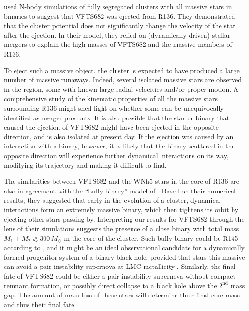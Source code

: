 \documentclass[apjl,twocolumn]{emulateapj}
\DeclareRobustCommand{\Figref}[1]{Fig.~\ref{#1}}
\begin{document}
\citet{banerjee:12} used N-body simulations of fully segregated
clusters with all massive stars in binaries to suggest that VFTS682
was ejected from R136. They
demonstrated that the cluster potential does not significantly change
the velocity of the star after the ejection. In their
model, they relied on (dynamically driven) stellar mergers to explain the high masses of
VFTS682 and the massive members of R136.%

To eject such a massive object, the cluster is
expected to have produced
a large number of massive runaways. Indeed, several %
isolated massive stars are observed in the region, some with known
large radial velocities and/or proper motion. %
A comprehensive study of the kinematic
properties of all the massive stars surrounding R136 might shed light
on whether some can be unequivocally identified as merger products. It
is also possible that the star or binary that caused the ejection of
VFTS682 might have been ejected in the opposite direction, and is also
isolated at present day. If the ejection was caused by an interaction
with a binary, however, it is likely that the binary scattered in the
opposite direction will experience further dynamical interactions on
its way, modifying its trajectory and making it difficult to find.  %

The similarities between VFTS682 and the WNh5 stars in the core of
R136 are also in agreement with the ``bully binary'' model of
\cite{fujii:11}. Based on their numerical results, they suggested that
early in the evolution of a cluster, dynamical interactions form an extremely
massive binary, which then tightens its orbit by ejecting other stars passing
by. Interpreting our results for VFTS682 through the lens of their simulations
suggests the presence of a close binary with total mass
$M_1+M_2\gtrsim 300\,M_\odot$ in the core of the cluster. Such bully
binary could be R145 according to \cite{fujii:11}, and it might be an
ideal observational candidate for a dynamically formed progenitor system of
a binary black-hole, provided that stars this massive can avoid a
pair-instability supernova \cite[e.g.,][]{rakavy:67} at LMC
metallicity \citep[see also][]{langer:07}. Similarly, the final fate of VFTS682 could be either a
pair-instability supernova without compact remnant formation, or
possibly direct collapse to a black hole above the $2^\mathrm{nd}$
mass gap. The amount of mass loss of these stars will determine their final core
mass and thus their final fate.
\end{document}
